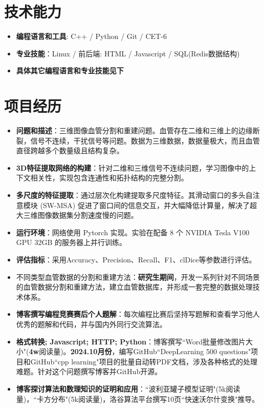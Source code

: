 \documentclass{resume}
\begin{document}
\section{技术能力}
\begin{itemize}[parsep=0.2ex]
	\item \textbf{编程语言和工具}: C++ / Python / Git / CET-6
	\item \textbf{专业技能}：Linux / 前后端: HTML / Javascript / SQL(Redis数据结构)
	\item \textbf{具体其它编程语言和专业技能见下}
\end{itemize}


\section{项目经历}

\begin{itemize}	
	\item \textbf{问题和描述}：三维图像血管分割和重建问题。血管存在二维和三维上的边缘断裂，信号不连续，干扰信号等问题。数据为三维数据，数据量极大，而且血管直径跨越多个数量级且结构复杂。
	\item \textbf{3D特征提取网络的构建}：针对二维和三维信号不连续问题，学习图像中的上下文相关性，实现包含连通性和拓扑结构的完整分割。
	\item \textbf{多尺度的特征提取}：通过层次化构建提取多尺度特征。其滑动窗口的多头自注意模块 (SW-MSA) 促进了窗口间的信息交互，并大幅降低计算量，解决了超大三维图像数据集分割速度慢的问题。
	\item \textbf{运行环境}：网络使用 Pytorch 实现。实验在配备 8 个 NVIDIA Tesla V100 GPU 32GB 的服务器上并行训练。
	\item \textbf{评估指标}：采用Accuracy、Precision、Recall、F1、clDice等参数进行评估。
	\item {不同类型血管数据的分割和重建方法}：\textbf{研究生期间}，开发一系列针对不同场景的血管数据分割和重建方法，建立血管数据库，并形成一套完整的数据处理技术体系。
\end{itemize}

\begin{itemize}
  \item \textbf{博客撰写编程竞赛赛后个人题解}：每次编程比赛后坚持写题解和查看学习他人优秀的题解和代码，并与国内外同行交流算法。
  \item \textbf{格式转换; Javascript; HTTP; Python}：博客撰写``Word批量修改图片大小"(\textbf{4w}阅读量)。\textbf{2024.10月份}，编写GitHub``DeepLearning 500 questions"项目和GitHub``cpp learning"项目的批量自动转PDF文档，涉及各种格式的处理难题。针对这个问题撰写博客并GitHub开源。
  \item \textbf{博客探讨算法和数理知识的证明和应用}：``波利亚罐子模型证明"(5k阅读量)，``卡方分布"(5k阅读量)，洛谷算法平台撰写10页``快速沃尔什变换"推导。
\end{itemize}
\end{document}
